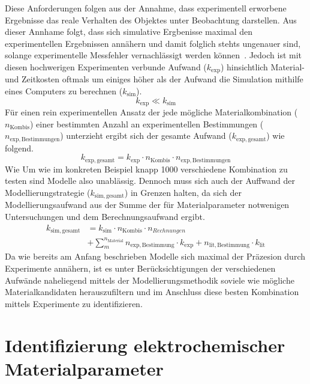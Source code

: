 Diese Anforderungen folgen aus der Annahme, dass experimentell erworbene Ergebnisse das reale Verhalten des Objektes unter Beobachtung darstellen. Aus dieser Annhame folgt, dass sich simulative Ergbenisse maximal den experimentellen Ergebnissen annähern und damit folglich stehts ungenauer sind, solange experimentelle Messfehler vernachlässigt werden können~\cite{Morris2024}. Jedoch ist mit diesen hochwerigen Experimenten verbunde Aufwand ($k_{\mathrm{exp}}$) hinsichtlich Material-  und Zeitkosten oftmals um einiges höher als der Aufwand die Simulation mithilfe eines Computers zu berechnen ($k_{\mathrm{sim}}$).
\begin{equation}
    k_{\mathrm{exp}} \ll k_{\mathrm{sim}} 
\end{equation}
Für einen rein experimentellen Ansatz der jede mögliche Materialkombination ($n_{\mathrm{Kombis}}$) einer bestimmten Anzahl an experimentellen Bestimmungen ($n_{\mathrm{exp,Bestimmungen}}$) unterzieht ergibt sich der gesamte Aufwand ($k_{\mathrm{exp, gesamt}}$) wie folgend.
\begin{equation}
    k_{\mathrm{exp, gesamt}} = k_{\mathrm{exp}} \cdot n_{\mathrm{Kombis}} \cdot n_{\mathrm{exp,Bestimmungen}}
\end{equation}
Wie 
Um wie im konkreten Beispiel knapp 1000 verschiedene Kombination zu testen sind Modelle also unablässig. Dennoch muss sich auch der Auffwand der Modellierungstrategie ($k_{\mathrm{sim, gesamt}}$) in Grenzen halten, da sich der Modellierungsaufwand aus der Summe der für Materialparameter notwenigen Untersuchungen und dem Berechnungsaufwand ergibt.
\begin{align}
    k_{\mathrm{sim, gesamt}} &= k_{\mathrm{sim}} \cdot n_{\mathrm{Kombis}} \cdot n_{Rechnungen} \nonumber \\
    &+ \sum_{m}^{n_{\mathrm{Material}}} n_{\mathrm{exp, Bestimmung}} \cdot k_{\mathrm{exp}} + n_{\mathrm{lit, Bestimmung}} \cdot k_{\mathrm{lit}} 
\end{align}
Da wie bereits am Anfang beschrieben Modelle sich maximal der Präzesion durch Experimente annähern, ist es unter Berücksichtigungen der verschiedenen Aufwände naheliegend mittels der Modellierungsmethodik soviele wie mögliche Materialkandidaten herauszufiltern und im Anschluss diese besten Kombination mittels Experimente zu identifizieren.


\section{Identifizierung elektrochemischer Materialparameter}

